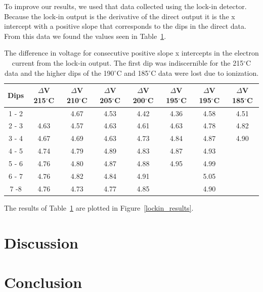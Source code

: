 \documentclass[prb,preprint]{revtex4-1}
\begin{document}
To improve our results, we used that data collected using the lock-in detector. Because the lock-in output is the derivative of the direct output it is the x intercept with a positive slope that corresponds to the dips in the direct data. From this data we found the values seen in Table~\ref{hg_lockin_table}.

\begin{table}[h!]
\centering

\caption{The difference in voltage for consecutive positive slope x intercepts in the electron current from the lock-in output. The first dip was indiscernible for the 215$^{\circ}$C data and the higher dips of the 190$^{\circ}$C and 185$^{\circ}$C data were lost due to ionization.}

\begin{ruledtabular}
\begin{tabular}{c c c c c c c c}
Dips & $\Delta$V 215$^{\circ}$C & $\Delta$V 210$^{\circ}$C  & $\Delta$V 205$^{\circ}$C &$\Delta$V 200$^{\circ}$C  & $\Delta$V 195$^{\circ}$C  & $\Delta$V 195$^{\circ}$C &$\Delta$V 185$^{\circ}$C  \\
\hline	%
1 - 2 &         & 4.67 & 4.53 & 4.42 & 4.36 & 4.58 & 4.51 \\
2 - 3 & 4.63 & 4.57 & 4.63 & 4.61 & 4.63 & 4.78 & 4.82 \\
3 - 4 & 4.67 & 4.69 & 4.63 & 4.73 & 4.84 & 4.87 & 4.90 \\
4 - 5 & 4.74 & 4.79 & 4.89 & 4.83 & 4.87 & 4.93 &         \\
5 - 6 & 4.76 & 4.80 & 4.87 & 4.88 & 4.95 & 4.99 &         \\
6 - 7 & 4.76 & 4.82 & 4.84 & 4.91 &         & 5.05 &         \\
7 -8  & 4.76 & 4.73 & 4.77 & 4.85 &         & 4.90 &         \\

\end{tabular}
\end{ruledtabular}
\label{hg_lockin_table}
\end{table}

The results of Table~\ref{hg_lockin_table} are plotted in Figure~\ref{lockin_results}. 


\section{Discussion}


\section{Conclusion}
\end{document}
